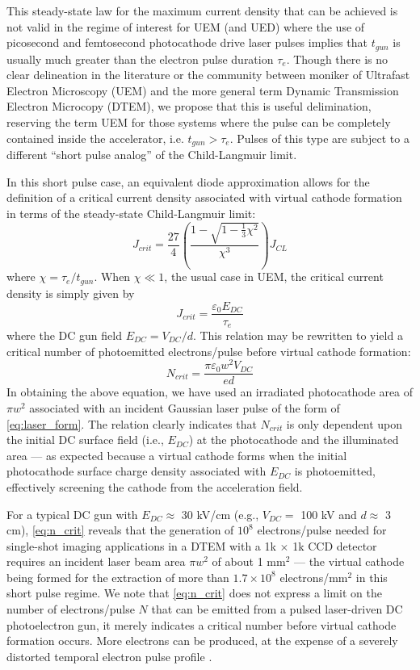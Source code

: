 This steady-state law for the maximum current density that can be achieved is not valid in the regime of interest for UEM (and UED) where the use of picosecond and femtosecond photocathode drive laser pulses implies that $t_{gun}$ is usually much greater than the electron pulse duration $\tau_e$.
Though there is no clear delineation in the literature or the community between moniker of Ultrafast Electron Microscopy (UEM) and the more general term Dynamic Transmission Electron Microcopy (DTEM), we propose that this is useful delimination, reserving the term UEM for those systems where the pulse can be completely contained inside the accelerator, i.e. $t_{gun} > \tau_e$.
Pulses of this type are subject to a different ``short pulse analog'' of the Child-Langmuir limit.

In this short pulse case, an equivalent diode approximation \cite{valfells_effects_2002} allows for the definition of a critical current density associated with virtual cathode formation in terms of the steady-state Child-Langmuir limit:
\begin{equation}
  J_{crit} = \frac{27}{4} \left ( \frac{ 1 - \sqrt{1-\tfrac{1}{3} \chi^2} }{ \chi^3 } \right ) J_{CL}
\end{equation}
where $\chi = \tau_e / t_{gun}$.
When $\chi \ll 1$, the usual case in UEM, the critical current density is simply given by
\begin{equation}
  J_{crit} = \frac{\varepsilon_0 E_{DC}}{\tau_e}
\end{equation}
where the DC gun field $E_{DC} = V_{DC}/d$.
This relation may be rewritten to yield a critical number of photoemitted electrons/pulse before virtual cathode formation:
\begin{equation} \label{eq:n_crit}
  N_{crit} = \frac{\pi \varepsilon_0 w^2 V_{DC}}{e d}
\end{equation}
In obtaining the above equation, we have used an irradiated photocathode area of $\pi w^2$ associated with an incident Gaussian laser pulse of the form of \ref{eq:laser_form}.
The relation clearly indicates that $N_{crit}$ is only dependent upon the initial DC surface field (i.e., $E_{DC}$) at the photocathode and the illuminated area --- as expected because a virtual cathode forms when the initial photocathode surface charge density associated with $E_{DC}$ is photoemitted, effectively screening the cathode from the acceleration field.

For a typical DC gun with $E_{DC} \approx $ 30 kV/cm (e.g., $V_{DC} = $ 100 kV and $d \approx $ 3 cm), \ref{eq:n_crit} reveals that the generation of $10^8$ electrons/pulse needed for single-shot imaging applications in a DTEM with a 1k $\times$ 1k CCD detector requires an incident laser beam area $\pi w^2$ of about 1 mm$^2$ --- the virtual cathode being formed for the extraction of more than $1.7 \times 10^8$ electrons/mm$^2$ in this short pulse regime.
We note that \ref{eq:n_crit} does not express a limit on the number of electrons/pulse $N$ that can be emitted from a pulsed laser-driven DC photoelectron gun, it merely indicates a critical number before virtual cathode formation occurs.
More electrons can be produced, at the expense of a severely distorted temporal electron pulse profile \cite{valfells_effects_2002}.

